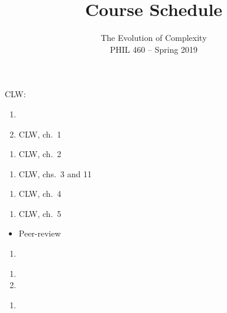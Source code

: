 \documentclass{article}
\author{\large The Evolution of Complexity\\ \normalsize PHIL 460 -- Spring 2019}
\date{}
\title{\bf Course Schedule\vspace{-0.5em}}
\begin{document}
\maketitle
\onehalfspacing{}






\noindent CLW: 


\dia{}
\NR{}

\dia{}
\begin{enumerate}
\item {}
\item CLW, ch.~1
\end{enumerate}

\dia{}
\begin{enumerate}
\item CLW, ch.~2
\end{enumerate}

\dia{}
\begin{enumerate}
\item CLW, chs.~3 and 11
\end{enumerate}

\dia{}
\begin{enumerate}
\item CLW, ch.~4
\end{enumerate}
\dia{}
\begin{enumerate}
\item CLW, ch.~5
\end{enumerate}

\dia{}
\begin{itemize}
\item[ ] Peer-review
\end{itemize}

\dia{}
\begin{enumerate}
\item {}
\end{enumerate}

\dia{}
\begin{enumerate}
\item {}
\item {}
\end{enumerate}

\dia{}
\begin{enumerate}
\item {}
\end{enumerate}
\end{document}
